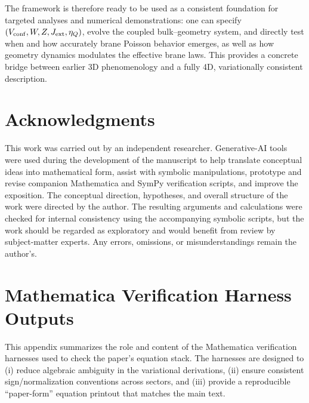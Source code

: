 \documentclass[11pt]{article}
\newcommand{\etaQ}{\eta_Q}
\begin{document}
The framework is therefore ready to be used as a consistent foundation for targeted analyses and numerical demonstrations: one can specify $(V_{\rm conf},W,Z,J_{\rm ext},\etaQ)$, evolve the coupled bulk--geometry system, and directly test when and how accurately brane Poisson behavior emerges, as well as how geometry dynamics modulates the effective brane laws. This provides a concrete bridge between earlier 3D phenomenology and a fully 4D, variationally consistent description.

\section*{Acknowledgments}
This work was carried out by an independent researcher. Generative-AI tools were used during the development of the manuscript to help translate conceptual ideas into mathematical form, assist with symbolic manipulations, prototype and revise companion Mathematica and SymPy verification scripts, and improve the exposition. The conceptual direction, hypotheses, and overall structure of the work were directed by the author. The resulting arguments and calculations were checked for internal consistency using the accompanying symbolic scripts, but the work should be regarded as exploratory and would benefit from review by subject-matter experts. Any errors, omissions, or misunderstandings remain the author’s.

\appendix

\section{Mathematica Verification Harness Outputs}
\label{app:wl}

This appendix summarizes the role and content of the Mathematica verification harnesses used to check the paper’s equation stack. The harnesses are designed to (i) reduce algebraic ambiguity in the variational derivations, (ii) ensure consistent sign/normalization conventions across sectors, and (iii) provide a reproducible “paper-form” equation printout that matches the main text.
\end{document}
